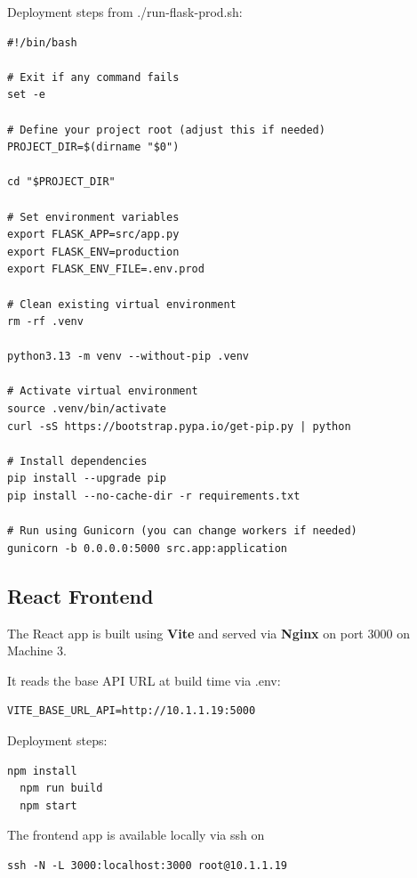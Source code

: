 Deployment steps from ./run-flask-prod.sh:

\begin{lstlisting}[style=bashstyle,label={lst:flask-backend-deployment-step},caption={Flask Backend Deployment Step}]
#!/bin/bash

# Exit if any command fails
set -e

# Define your project root (adjust this if needed)
PROJECT_DIR=$(dirname "$0")

cd "$PROJECT_DIR"

# Set environment variables
export FLASK_APP=src/app.py
export FLASK_ENV=production
export FLASK_ENV_FILE=.env.prod

# Clean existing virtual environment
rm -rf .venv

python3.13 -m venv --without-pip .venv

# Activate virtual environment
source .venv/bin/activate
curl -sS https://bootstrap.pypa.io/get-pip.py | python

# Install dependencies
pip install --upgrade pip
pip install --no-cache-dir -r requirements.txt

# Run using Gunicorn (you can change workers if needed)
gunicorn -b 0.0.0.0:5000 src.app:application

\end{lstlisting}

\subsection{React Frontend}\label{subsec:react-frontend}

The React app is built using \textbf{Vite} and served via \textbf{Nginx} on port 3000 on Machine 3.

It reads the base API URL at build time via .env:
\begin{lstlisting}[style=bashstyle,label={lst:react-frontend-environment},caption={React Frontend Environment}]
VITE_BASE_URL_API=http://10.1.1.19:5000
\end{lstlisting}

Deployment steps:

\begin{lstlisting}[style=bashstyle,label={lst:react-frontend-deployment-step},caption={React Frontend Deployment Step}]
  npm install
  npm run build
  npm start
\end{lstlisting}


The frontend app is available locally via ssh on
\begin{lstlisting}[style=bashstyle,label={lst:react-frontend-access-ssh},caption={React Frontend Access via SSH Command}]
ssh -N -L 3000:localhost:3000 root@10.1.1.19
\end{lstlisting}



